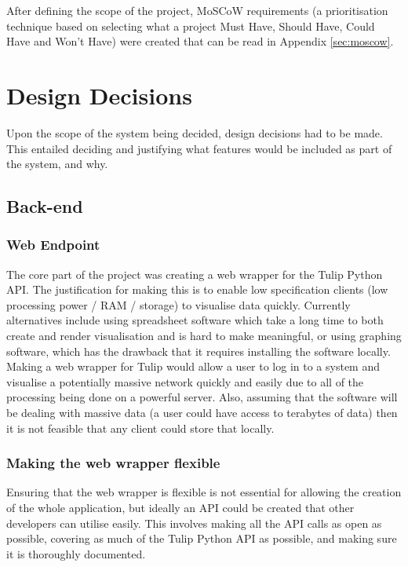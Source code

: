 \documentclass[../dissertation.tex]{subfiles}
\begin{document}
After defining the scope of the project, MoSCoW requirements (a prioritisation technique based on selecting what a project Must Have, Should Have, Could Have and Won't Have) were created that can be read in Appendix \ref{sec:moscow}.

\section{Design Decisions}
\label{sec:designdec}

Upon the scope of the system being decided, design decisions had to be made. This entailed deciding and justifying what features would be included as part of the system, and why.

\subsection{Back-end}

\subsubsection{Web Endpoint}

The core part of the project was creating a web wrapper for the Tulip Python API. The justification for making this is to enable low specification clients (low processing power / RAM / storage) to visualise data quickly. Currently alternatives include using spreadsheet software which take a long time to both create and render visualisation and is hard to make meaningful, or using graphing software, which has the drawback that it requires installing the software locally. Making a web wrapper for Tulip would allow a user to log in to a system and visualise a potentially massive network quickly and easily due to all of the processing being done on a powerful server. Also, assuming that the software will be dealing with massive data (a user could have access to terabytes of data) then it is not feasible that any client could store that locally.

\subsubsection{Making the web wrapper flexible}

Ensuring that the web wrapper is flexible is not essential for allowing the creation of the whole application, but ideally an API could be created that other developers can utilise easily. This involves making all the API calls as open as possible, covering as much of the Tulip Python API as possible, and making sure it is thoroughly documented. 
\end{document}
